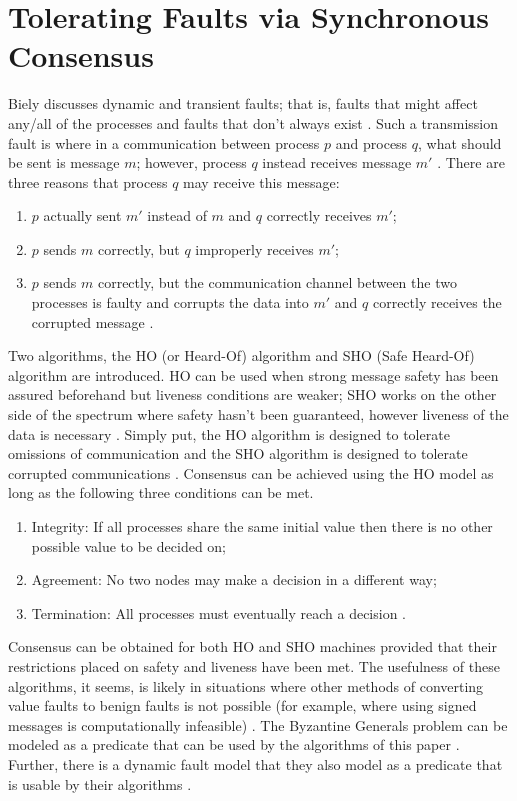 \documentclass[twoside, conference]{IEEEtran}
\begin{document}
\section{Tolerating Faults via Synchronous Consensus}\label{sec:toleratingfaults}
Biely discusses dynamic and transient faults; that is, faults that might affect any/all of the processes and faults that don't always exist \cite{Biely2007}.  Such a transmission fault is where in a communication between process $p$ and process $q$, what should be sent is message $m$; however, process $q$ instead receives message $m'$ \cite{Biely2007}.  There are three reasons that process $q$ may receive this message:
\begin{enumerate}
	\item $p$ actually sent $m'$ instead of $m$ and $q$ correctly receives $m'$;
	\item $p$ sends $m$ correctly, but $q$ improperly receives $m'$;
	\item $p$ sends $m$ correctly, but the communication channel between the two processes is faulty and corrupts the data into $m'$ and $q$ correctly receives the corrupted message \cite{Biely2007}.
\end{enumerate}
Two algorithms, the HO (or Heard-Of) algorithm and SHO (Safe Heard-Of) algorithm are introduced.  HO can be used when strong message safety has been assured beforehand but liveness conditions are weaker; SHO works on the other side of the spectrum where safety hasn't been guaranteed, however liveness of the data is necessary \cite{Biely2007}.  Simply put, the HO algorithm is designed to tolerate omissions of communication and the SHO algorithm is designed to tolerate corrupted communications \cite{Biely2007}.
Consensus can be achieved using the HO model as long as the following three conditions can be met.
\begin{enumerate}
	\item Integrity: If all processes share the same initial value then there is no other possible value to be decided on;
	\item Agreement: No two nodes may make a decision in a different way;
	\item Termination: All processes must eventually reach a decision \cite{Biely2007}.
\end{enumerate}
Consensus can be obtained for both HO and SHO machines provided that their restrictions placed on safety and liveness have been met.  The usefulness of these algorithms, it seems, is likely in situations where other methods of converting value faults to benign faults is not possible (for example, where using signed messages is computationally infeasible) \cite{Biely2007}.  The Byzantine Generals problem can be modeled as a predicate that can be used by the algorithms of this paper \cite{Biely2007}.  Further, there is a dynamic fault model that they also model as a predicate that is usable by their algorithms \cite{Biely2007}.
\end{document}
